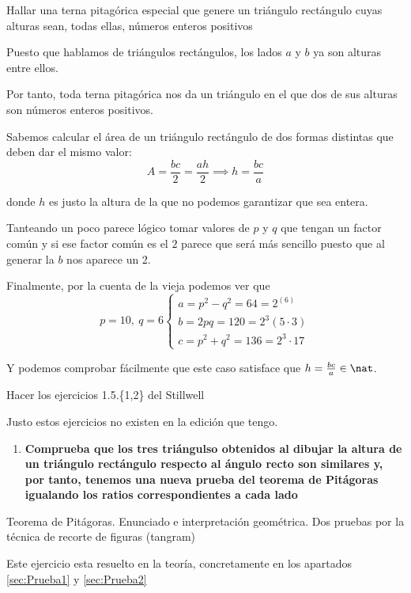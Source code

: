 \begin{problem}[13]
Hallar una terna pitagórica especial que genere un triángulo rectángulo cuyas alturas sean, todas ellas, números enteros positivos
\solution


Puesto que hablamos de triángulos rectángulos, los lados $a$ y $b$ ya son alturas entre ellos.

Por tanto, toda terna pitagórica nos da un triángulo en el que dos de sus alturas son números enteros positivos.

Sabemos calcular el área de un triángulo rectángulo de dos formas distintas que deben dar el mismo valor:
\[A = \frac{bc}{2} = \frac{ah}{2} \implies h = \frac{bc}{a}\]

donde $h$ es justo la altura de la que no podemos garantizar que sea entera.

Tanteando un poco parece lógico tomar valores de $p$ y $q$ que tengan un factor común y si ese factor común es el $2$ parece que será más sencillo puesto que al generar la $b$ nos aparece un 2.

Finalmente, por la cuenta de la vieja podemos ver que
\[p=10, \ q=6\left\{ \begin{array}{l} a=p^2-q^2=64=2^(6) \\ b=2pq=120=2^3(5\cdot 3) \\ c=p^2+q^2=136=2^3\cdot 17 \end{array} \right. \]

Y podemos comprobar fácilmente que este caso satisface que $h=\frac{bc}{a} \in \nat$.
\end{problem}

\begin{problem}[14]
Hacer los ejercicios 1.5.\{1,2\} del Stillwell
\solution


Justo estos ejercicios no existen en la edición que tengo.

\begin{enumerate}
\item \textbf{Comprueba que los tres triángulso obtenidos al dibujar la altura de un triángulo rectángulo respecto al ángulo recto son similares y, por tanto, tenemos una nueva prueba del teorema de Pitágoras igualando los ratios correspondientes a cada lado}

\end{enumerate}
\end{problem}

\begin{problem}[15]
Teorema de Pitágoras. Enunciado e interpretación geométrica. Dos pruebas por la técnica de recorte de figuras (tangram)
\solution

Este ejercicio esta resuelto en la teoría, concretamente en los apartados \ref{sec:Prueba1} y \ref{sec:Prueba2}
\end{problem}

